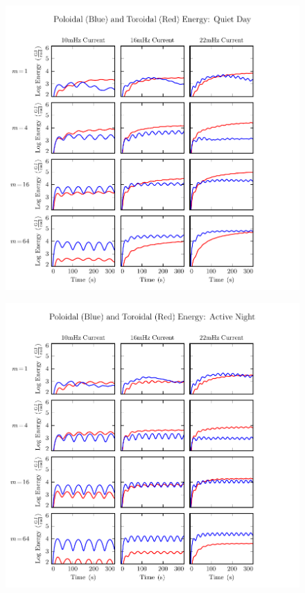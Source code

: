 \begin{figure}[H]
    \centering
    \includegraphics[width=\textwidth]{figures/UP_UT_J_2.pdf}
    \caption[Current-Driven Poloidal and Toroidal Energy: Quiet Day]{}
    \label{fig_UP_UT_J_2}
\end{figure}

\begin{figure}[H]
    \centering
    \includegraphics[width=\textwidth]{figures/UP_UT_J_3.pdf}
    \caption[Current-Driven Poloidal and Toroidal Energy: Active Night]{}
    \label{fig_UP_UT_J_3}
\end{figure}

